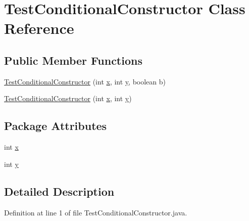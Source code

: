 \hypertarget{classTestConditionalConstructor}{
\section{TestConditionalConstructor Class Reference}
\label{classTestConditionalConstructor}
}
\subsection*{Public Member Functions}
\begin{DoxyCompactItemize}
\item 
\hyperlink{classTestConditionalConstructor_ab798c4479d9fcd686413be6f0d90fc44}{TestConditionalConstructor} (int \hyperlink{classTestConditionalConstructor_a178d1ff647a108fe35c03b3927d812d5}{x}, int \hyperlink{classTestConditionalConstructor_a9d4b5fe92fb28e1f6a47420bc248eac3}{y}, boolean b)
\item 
\hyperlink{classTestConditionalConstructor_a388128d3351a6755edff1cc47e5bf728}{TestConditionalConstructor} (int \hyperlink{classTestConditionalConstructor_a178d1ff647a108fe35c03b3927d812d5}{x}, int \hyperlink{classTestConditionalConstructor_a9d4b5fe92fb28e1f6a47420bc248eac3}{y})
\end{DoxyCompactItemize}
\subsection*{Package Attributes}
\begin{DoxyCompactItemize}
\item 
int \hyperlink{classTestConditionalConstructor_a178d1ff647a108fe35c03b3927d812d5}{x}
\item 
int \hyperlink{classTestConditionalConstructor_a9d4b5fe92fb28e1f6a47420bc248eac3}{y}
\end{DoxyCompactItemize}


\subsection{Detailed Description}


Definition at line 1 of file TestConditionalConstructor.java.



